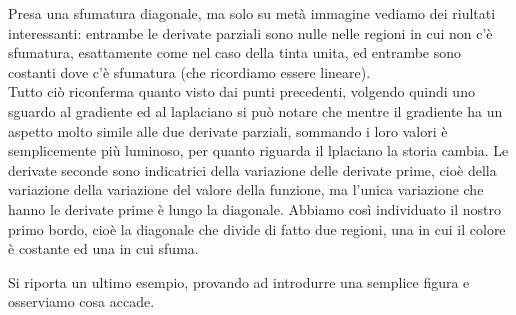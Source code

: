 Presa una sfumatura diagonale, ma solo su metà immagine vediamo dei riultati interessanti: entrambe le derivate parziali sono nulle nelle regioni in cui non c'è sfumatura, esattamente come nel caso della tinta unita, ed entrambe sono costanti dove c'è sfumatura (che ricordiamo essere lineare).\\
Tutto ciò riconferma quanto visto dai punti precedenti, volgendo quindi uno sguardo al gradiente ed al laplaciano si può notare che mentre il gradiente ha un aspetto molto simile alle due derivate parziali, sommando i loro valori è semplicemente più luminoso, per quanto riguarda il lplaciano la storia cambia. Le derivate seconde sono indicatrici della variazione delle derivate prime, cioè della variazione della variazione del valore della funzione, ma l'unica variazione che hanno le derivate prime è lungo la diagonale.
Abbiamo così individuato il nostro primo bordo, cioè la diagonale che divide di fatto due regioni, una in cui il colore è costante ed una in cui sfuma.\\

\vspace{1em}

Si riporta un ultimo esempio, provando ad introdurre una semplice figura e osserviamo cosa accade.\\

